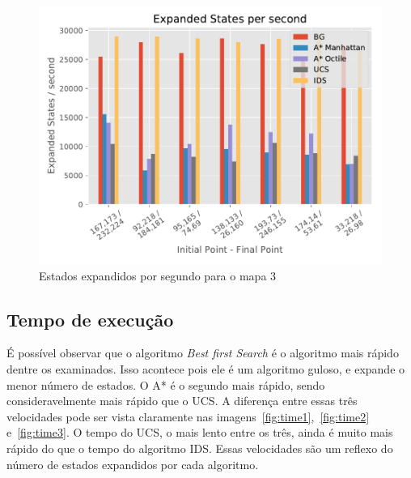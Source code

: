 \begin{figure}[!htbp]
\begin{minipage}{0.5\linewidth}
\includegraphics[width=\textwidth]{Images/Expanded_States_sec_map3.pdf}
\caption{Estados expandidos por segundo para o mapa 3}
\label{fig:expanded-sec3}
\end{minipage}
\end{figure}

\subsection{Tempo de execução}

É possível observar que o algoritmo \textit{Best first Search} é o algoritmo mais rápido dentre os examinados. Isso acontece pois ele é um algoritmo guloso, e expande o menor número de estados. O A* é o segundo mais rápido, sendo consideravelmente mais rápido que o UCS. A diferença entre essas três velocidades pode ser vista claramente nas imagens~\ref{fig:time1},~\ref{fig:time2} e~\ref{fig:time3}. O tempo do UCS, o mais lento entre os três, ainda é muito mais rápido do que o tempo do algoritmo IDS. Essas velocidades são um reflexo do número de estados expandidos por cada algoritmo.

